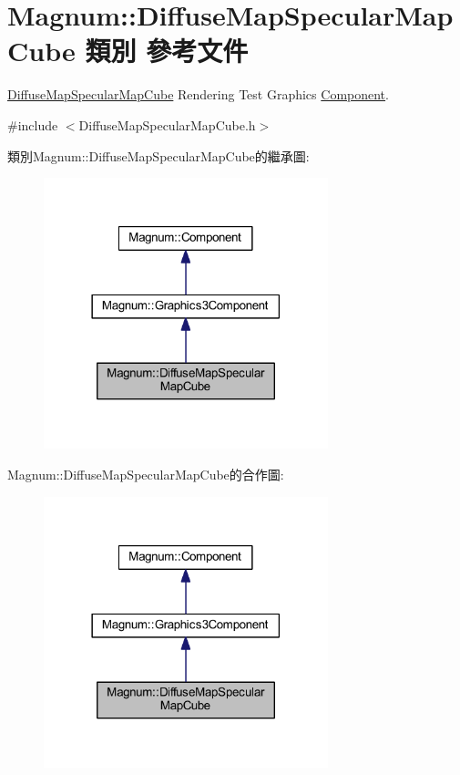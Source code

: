 \hypertarget{class_magnum_1_1_diffuse_map_specular_map_cube}{}\section{Magnum\+:\+:Diffuse\+Map\+Specular\+Map\+Cube 類別 參考文件}
\label{class_magnum_1_1_diffuse_map_specular_map_cube}


\hyperlink{class_magnum_1_1_diffuse_map_specular_map_cube}{Diffuse\+Map\+Specular\+Map\+Cube} Rendering Test Graphics \hyperlink{class_magnum_1_1_component}{Component}.  




{\ttfamily \#include $<$Diffuse\+Map\+Specular\+Map\+Cube.\+h$>$}



類別\+Magnum\+:\+:Diffuse\+Map\+Specular\+Map\+Cube的繼承圖\+:\nopagebreak
\begin{figure}[H]
\begin{center}
\leavevmode
\includegraphics[width=234pt]{class_magnum_1_1_diffuse_map_specular_map_cube__inherit__graph}
\end{center}
\end{figure}


Magnum\+:\+:Diffuse\+Map\+Specular\+Map\+Cube的合作圖\+:\nopagebreak
\begin{figure}[H]
\begin{center}
\leavevmode
\includegraphics[width=234pt]{class_magnum_1_1_diffuse_map_specular_map_cube__coll__graph}
\end{center}
\end{figure}
